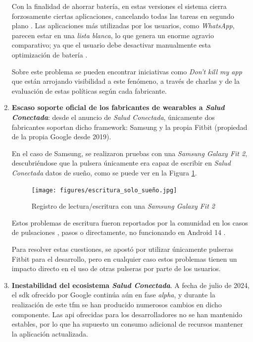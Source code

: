 \begin{enumerate}
        Con la finalidad de ahorrar batería, en estas versiones el sistema cierra forzosamente ciertas aplicaciones, cancelando todas las tareas en segundo plano \cite{manohar_is_2020}. Las aplicaciones más utilizadas por los usuarios, como \textit{WhatsApp}, parecen estar en una \textit{lista blanca}, lo que genera un enorme agravio comparativo; ya que el usuario debe desactivar manualmente esta optimización de batería \cite{shukla_work_2021}.
    
        Sobre este problema se pueden encontrar iniciativas como \textit{Don't kill my app} \cite{dont_kill_my_app_our_nodate} que están arrojando visibilidad a este fenómeno, a través de charlas y de la evaluación de estas políticas según cada fabricante.
    
        \item \textbf{Escaso soporte oficial de los fabricantes de \glspl{wearable} a \textit{Salud Conectada}}: desde el anuncio de \textit{Salud Conectada}, únicamente dos fabricantes soportan dicho \gls{framework}: Samsung y la propia Fitbit (propiedad de la propia Google desde 2019). 
        
        En el caso de Samsung, se realizaron pruebas con una \textit{Samsung Galaxy Fit 2}, descubriéndose que la pulsera únicamente era capaz de escribir en \textit{Salud Conectada} datos de sueño, como se puede ver en la Figura \ref{figure:problemas:samsung_sueño}.
    
        \begin{figure}[h]
            \centering
            \texttt{[image: figures/escritura\_solo\_sueño.jpg]}
            \caption{Registro de lectura/escritura con una \textit{Samsung Galaxy Fit 2}}
            \label{figure:problemas:samsung_sueño}
        \end{figure}
    
        Estos problemas de escritura fueron reportados por la comunidad en los casos de pulsaciones \cite{jauwaadshams_heart_2023}, pasos \cite{ste1603137554_samsung_2022} o directamente, no funcionando en Android 14 \cite{muzzas_samsung_2023}.
    
        Para resolver estas cuestiones, se apostó por utilizar únicamente pulseras Fitbit para el desarrollo, pero en cualquier caso estos problemas tienen un impacto directo en el uso de otras pulseras por parte de los usuarios.
        
        \item \textbf{Inestabilidad del ecosistema \textit{Salud Conectada}}. A fecha de julio de 2024, el \gls{sdk} ofrecido por Google continúa aún en fase \textit{alpha}, y durante la realización de este \gls{tfm} se han producido numerosos cambios en dicho componente. Las \gls{api} ofrecidas para los desarrolladores no se han mantenido estables, por lo que ha supuesto un consumo adicional de recursos mantener la aplicación actualizada.
    

\end{enumerate}
